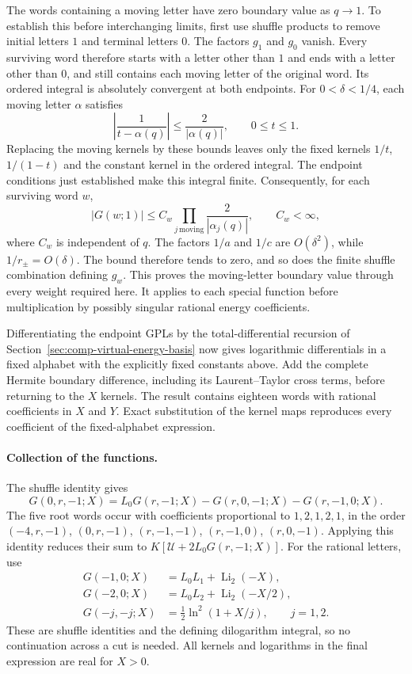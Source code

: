 The words containing a moving letter have zero boundary value as
$q\to1$. To establish this before interchanging limits, first use
shuffle products to remove initial letters $1$ and terminal letters $0$.
The factors $g_1$ and $g_0$ vanish. Every surviving word therefore
starts with a letter other than $1$ and ends with a letter other than
$0$, and still contains each moving letter of the original word.
Its ordered integral is absolutely convergent at both endpoints.
For $0<\delta<1/4$, each moving letter $\alpha$ satisfies
\begin{equation}
 \left|\frac1{t-\alpha(q)}\right|\leq\frac2{|\alpha(q)|},
 \qquad 0\leq t\leq1.
\end{equation}
Replacing the moving kernels by these bounds leaves only the fixed
kernels $1/t$, $1/(1-t)$ and the constant kernel in the ordered integral.
The endpoint conditions just established make this integral finite.
Consequently, for each surviving word $w$,
\begin{equation}
 |G(w;1)|\leq C_w
 \prod_{j\,\mathrm{moving}}\frac2{|\alpha_j(q)|},
 \qquad C_w<\infty,
\end{equation}
where $C_w$ is independent of $q$. The factors $1/a$ and $1/c$
are $O(\delta^2)$, while $1/r_\pm=O(\delta)$. The bound therefore
tends to zero, and so does the finite shuffle combination defining
$g_w$. This proves the moving-letter boundary value through every
weight required here. It applies to each special function before
multiplication by possibly singular rational energy coefficients.

Differentiating the endpoint GPLs by the total-differential recursion
of Section~\ref{sec:comp-virtual-energy-basis} now gives logarithmic
differentials in a fixed alphabet with the explicitly fixed constants
above. Add the complete Hermite boundary difference, including its
Laurent--Taylor cross terms, before returning to the $X$ kernels.
The result contains eighteen words with rational coefficients in $X$
and $Y$. Exact substitution of the kernel maps reproduces every
coefficient of the fixed-alphabet expression.
\paragraph{Collection of the functions.} The shuffle identity gives
\begin{equation}G(0,r,-1;X)=L_0G(r,-1;X)-G(r,0,-1;X)-G(r,-1,0;X).\end{equation}
The five root words occur with coefficients proportional to $1,2,1,2,1$, in the order $(-4,r,-1)$, $(0,r,-1)$, $(r,-1,-1)$, $(r,-1,0)$, $(r,0,-1)$. Applying this identity reduces their sum to $K[\mathcal U+2L_0G(r,-1;X)]$. For the rational letters, use
\begin{align}G(-1,0;X)&=L_0L_1+\operatorname{Li}_2(-X),\\
G(-2,0;X)&=L_0L_2+\operatorname{Li}_2(-X/2),\\
G(-j,-j;X)&=\tfrac12\ln^2(1+X/j),\qquad j=1,2.\end{align}
These are shuffle identities and the defining dilogarithm integral, so no continuation across a cut is needed. All kernels and logarithms in the final expression are real for $X>0$.
